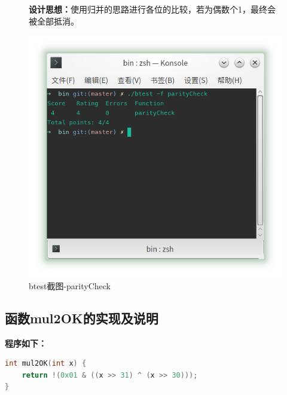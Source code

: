 \begin{figure}[H]
    \begin{minipage}[c]{0.5\linewidth}
        \textbf{设计思想：}使用归并的思路进行各位的比较，若为偶数个1，最终会被全部抵消。
    \end{minipage}
    \begin{minipage}[c]{0.4\linewidth}
        \centering
        \includegraphics[width=0.9\linewidth]{figures/parityCheck}
        \caption{btest截图-parityCheck}
        \label{fig:parityCheck}
    \end{minipage}
\end{figure}

\subsection{函数mul2OK的实现及说明}
\textbf{程序如下：}

\begin{lstlisting}[language = c]
int mul2OK(int x) {
	return !(0x01 & ((x >> 31) ^ (x >> 30)));
}
\end{lstlisting}


